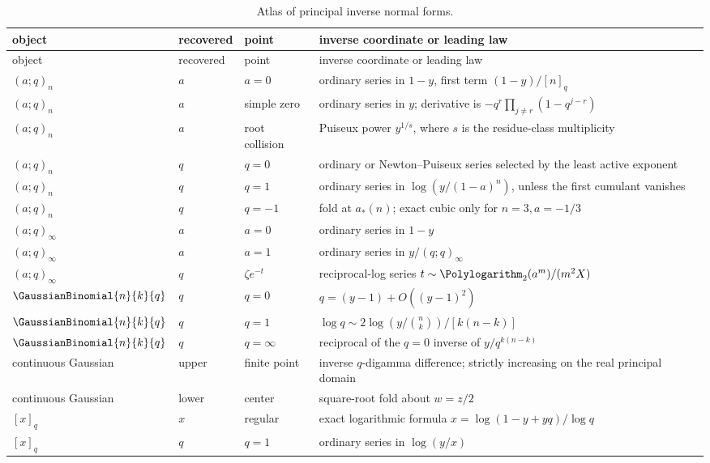 \documentclass[11pt,letterpaper,oneside,openany]{book}
\theoremstyle{definition}
\theoremstyle{remark}
\begin{document}
\begin{longtable}{@{}p{}p{}p{}p{}@{}}
\caption{Atlas of principal inverse normal forms.}\label{tab:inverse-atlas}\\
\toprule
object & recovered & point & inverse coordinate or leading law\\
\midrule
\endfirsthead
\toprule
object & recovered & point & inverse coordinate or leading law\\
\midrule
\endhead
\((a;q)_n\) & \(a\) & \(a=0\) & ordinary series in \(1-y\), first term
\((1-y)/[n]_q\)\\
\((a;q)_n\) & \(a\) & simple zero & ordinary series in \(y\); derivative is
\(-q^r\prod_{j\ne r}(1-q^{j-r})\)\\
\((a;q)_n\) & \(a\) & root collision & Puiseux power \(y^{1/s}\), where
\(s\) is the residue-class multiplicity\\
\((a;q)_n\) & \(q\) & \(q=0\) & ordinary or Newton--Puiseux series selected by
the least active exponent\\
\((a;q)_n\) & \(q\) & \(q=1\) & ordinary series in
\(\log(y/(1-a)^n)\), unless the first cumulant vanishes\\
\((a;q)_n\) & \(q\) & \(q=-1\) & fold at \(a_*(n)\); exact cubic only for
\(n=3,a=-1/3\)\\
\((a;q)_\infty\) & \(a\) & \(a=0\) & ordinary series in \(1-y\)\\
\((a;q)_\infty\) & \(a\) & \(a=1\) & ordinary series in
\(y/(q;q)_\infty\)\\
\((a;q)_\infty\) & \(q\) & \(\zeta e^{-t}\) & reciprocal-log series
\(t\sim \Polylogarithm_2(a^m)/(m^2X)\)\\
\(\GaussianBinomial{n}{k}{q}\) & \(q\) & \(q=0\) & \(q=(y-1)+O((y-1)^2)\)\\
\(\GaussianBinomial{n}{k}{q}\) & \(q\) & \(q=1\) & \(\log q\sim2\log(y/\binom nk)/[k(n-k)]\)\\
\(\GaussianBinomial{n}{k}{q}\) & \(q\) & \(q=\infty\) & reciprocal of the \(q=0\) inverse
of \(y/q^{k(n-k)}\)\\
continuous Gaussian & upper & finite point & inverse \(q\)-digamma difference;
strictly increasing on the real principal domain\\
continuous Gaussian & lower & center & square-root fold about \(w=z/2\)\\
\([x]_q\) & \(x\) & regular & exact logarithmic formula
\(x=\log(1-y+yq)/\log q\)\\
\([x]_q\) & \(q\) & \(q=1\) & ordinary series in \(\log(y/x)\)\\

\end{longtable}
\end{document}
